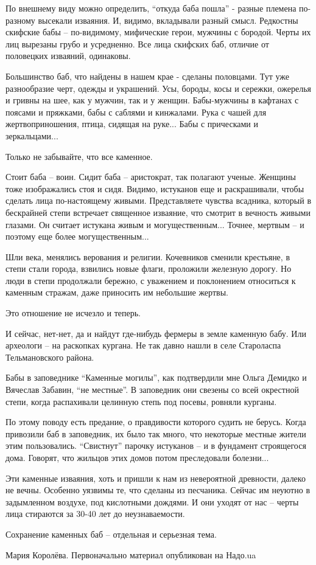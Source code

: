 По внешнему виду можно определить, \enquote{откуда баба пошла} - разные племена
по-разному высекали изваяния. И, видимо, вкладывали разный смысл. Редкостны
скифские бабы – по-видимому, мифические герои, мужчины с бородой. Черты их лиц
вырезаны грубо и усредненно. Все лица скифских баб, отличие от половецких
изваяний, одинаковы.

Большинство баб, что найдены в нашем крае - сделаны половцами. Тут уже
разнообразие черт, одежды и украшений. Усы, бороды, косы и сережки, ожерелья и
гривны на шее, как у мужчин, так и у женщин. Бабы-мужчины в кафтанах с поясами
и пряжками, бабы с саблями и кинжалами. Рука с чашей для жертвоприношения,
птица, сидящая на руке... Бабы с прическами и зеркальцами...

Только не забывайте, что все каменное.

Стоит баба – воин. Сидит баба – аристократ, так полагают ученые. Женщины тоже
изображались стоя и сидя. Видимо, истуканов еще и раскрашивали, чтобы сделать
лица по-настоящему живыми. Представляете чувства всадника, который в бескрайней
степи встречает священное изваяние, что смотрит в вечность живыми глазами. Он
считает истукана живым и могущественным... Точнее, мертвым – и поэтому еще более
могущественным...

Шли века, менялись верования и религии. Кочевников сменили крестьяне, в степи
стали города, взвились новые флаги, проложили железную дорогу. Но люди в степи
продолжали бережно, с уважением и поклонением относиться к каменным стражам,
даже приносить им небольшие жертвы.

Это отношение не исчезло и теперь.

И сейчас, нет-нет, да и найдут где-нибудь фермеры в земле каменную бабу. Или
археологи – на раскопках кургана. Не так давно нашли в селе Староласпа
Тельмановского района.

Бабы в заповеднике \enquote{Каменные могилы}, как подтвердили мне Ольга Демидко и
Вячеслав Забавин, \enquote{не местные}. В заповедник они свезены со всей окрестной
степи, когда распахивали целинную степь под посевы, ровняли курганы.

По этому поводу есть предание, о правдивости которого судить не берусь. Когда
привозили баб в заповедник, их было так много, что некоторые местные жители
этим пользовались. \enquote{Свистнут} парочку истуканов – и в фундамент строящегося
дома. Говорят, что жильцов этих домов потом преследовали болезни...

Эти каменные изваяния, хоть и пришли к нам из невероятной древности, далеко не
вечны. Особенно уязвимы те, что сделаны из песчаника. Сейчас им неуютно в
задымленном воздухе, под кислотными дождями. И они уходят от нас – черты лица
стираются за 30-40 лет до неузнаваемости.

Сохранение каменных баб – отдельная и серьезная тема.

Мария Королёва. Первоначально материал опубликован на Надо.ua
